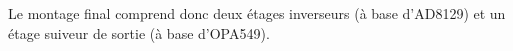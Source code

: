 \documentclass{../template/tp}
\begin{document}
{\begin{enumerate}
		Le montage final comprend donc deux étages inverseurs (à base d'AD8129) et un étage suiveur de sortie (à base d'OPA549).
	\end{enumerate}
}


\end{document}
